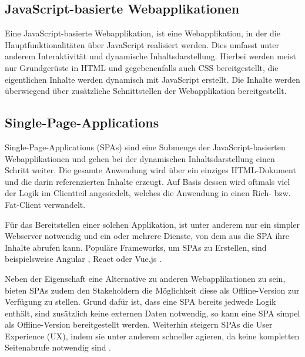 


\subsection{JavaScript-basierte Webapplikationen}

Eine JavaScript-basierte Webapplikation, ist eine Webapplikation, in der die Hauptfunktionalitäten über JavaScript realisiert werden. Dies umfasst unter anderem Interaktivität und dynamische Inhaltsdarstellung. Hierbei werden meist nur Grundgerüste in HTML und gegebenenfalls auch CSS bereitgestellt, die eigentlichen Inhalte werden dynamisch mit JavaScript erstellt. Die Inhalte werden überwiegend über zusätzliche Schnittstellen der Webapplikation bereitgestellt.

\subsection{Single-Page-Applications}
\label{subsec:singe-page-applications}

Single-Page-Applications (SPAs) sind eine Submenge der JavaScript-basierten Webapplikationen und gehen bei der dynamischen Inhaltsdarstellung einen Schritt weiter. Die gesamte Anwendung wird über ein einziges HTML-Dokument und die darin referenzierten Inhalte erzeugt. Auf Basis dessen wird oftmals viel der Logik im Clientteil angesiedelt, welches die Anwendung in einen Rich- bzw. Fat-Client verwandelt.

Für das Bereitstellen einer solchen Applikation, ist unter anderem nur ein simpler Webserver notwendig und ein oder mehrere Dienste, von dem aus die SPA ihre Inhalte abrufen kann. Populäre Frameworks, um SPAs zu Erstellen, sind beispielsweise Angular \cite{AngularHomepage}, React \cite{ReactHomepage} oder Vue.js \cite{VueJSHomepage}.

Neben der Eigenschaft eine Alternative zu anderen Webapplikationen zu sein, bieten SPAs zudem den Stakeholdern die Möglichkeit diese als Offline-Version zur Verfügung zu stellen. Grund dafür ist, dass eine SPA bereits jedwede Logik enthält, sind zusätzlich keine externen Daten notwendig, so kann eine SPA simpel als Offline-Version bereitgestellt werden. Weiterhin steigern SPAs die User Experience (UX), indem sie unter anderem schneller agieren, da keine kompletten Seitenabrufe notwendig sind \cite{ImprovementOfAcedemicServiceBasedOnSPA}.

